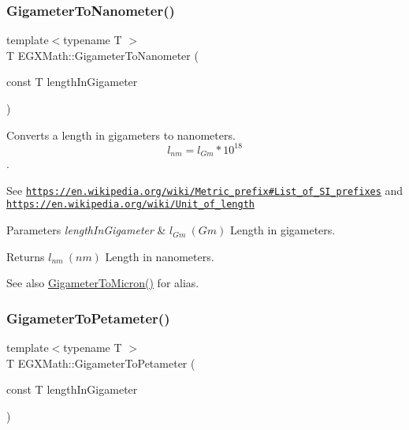 \subsubsection{\texorpdfstring{Gigameter\+To\+Nanometer()}{GigameterToNanometer()}}
{\footnotesize\ttfamily template$<$typename T $>$ \\
T E\+G\+X\+Math\+::\+Gigameter\+To\+Nanometer (\begin{DoxyParamCaption}\item[{const T}]{length\+In\+Gigameter }\end{DoxyParamCaption})}



Converts a length in gigameters to nanometers. \[ l_{nm}=l_{Gm} * 10^{18} \]. 

See \href{https://en.wikipedia.org/wiki/Metric_prefix#List_of_SI_prefixes}{\tt https\+://en.\+wikipedia.\+org/wiki/\+Metric\+\_\+prefix\#\+List\+\_\+of\+\_\+\+S\+I\+\_\+prefixes} and \href{https://en.wikipedia.org/wiki/Unit_of_length}{\tt https\+://en.\+wikipedia.\+org/wiki/\+Unit\+\_\+of\+\_\+length} 
\begin{DoxyParams}{Parameters}
{\em length\+In\+Gigameter} & $ l_{Gm}\ (Gm)$ Length in gigameters. \\
\hline
\end{DoxyParams}
\begin{DoxyReturn}{Returns}
$ l_{nm}\ (nm)$ Length in nanometers. 
\end{DoxyReturn}
\begin{DoxySeeAlso}{See also}
\mbox{\hyperlink{group___e_g_x_math-_conversions-_length_conversions-_s_i-_gigameter-_non-_s_i_ga90426d22455e96b1f61e1850c7b89f77}{Gigameter\+To\+Micron()}} for alias. 
\end{DoxySeeAlso}
\mbox{\label{group___e_g_x_math-_conversions-_length_conversions-_s_i-_gigameter-_s_i_gae0dceabe14b5e84394285441be46bb8d}} 
\subsubsection{\texorpdfstring{Gigameter\+To\+Petameter()}{GigameterToPetameter()}}
{\footnotesize\ttfamily template$<$typename T $>$ \\
T E\+G\+X\+Math\+::\+Gigameter\+To\+Petameter (\begin{DoxyParamCaption}\item[{const T}]{length\+In\+Gigameter }\end{DoxyParamCaption})}



